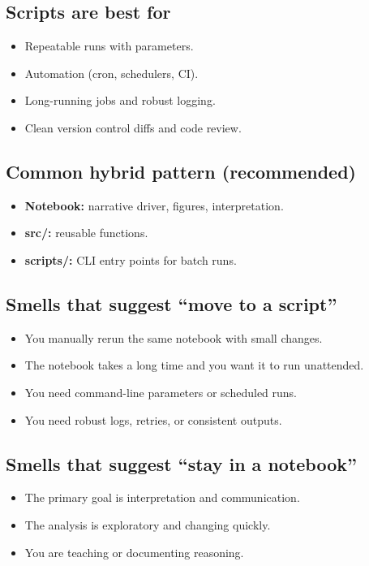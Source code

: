 \subsection{Scripts are best for}
\begin{itemize}
\item Repeatable runs with parameters.
\item Automation (cron, schedulers, CI).
\item Long-running jobs and robust logging.
\item Clean version control diffs and code review.
\end{itemize}

\subsection{Common hybrid pattern (recommended)}
\begin{itemize}
\item \textbf{Notebook:} narrative driver, figures, interpretation.
\item \textbf{src/:} reusable functions.
\item \textbf{scripts/:} CLI entry points for batch runs.
\end{itemize}

\subsection{Smells that suggest ``move to a script''}
\begin{itemize}
\item You manually rerun the same notebook with small changes.
\item The notebook takes a long time and you want it to run unattended.
\item You need command-line parameters or scheduled runs.
\item You need robust logs, retries, or consistent outputs.
\end{itemize}

\subsection{Smells that suggest ``stay in a notebook''}
\begin{itemize}
\item The primary goal is interpretation and communication.
\item The analysis is exploratory and changing quickly.
\item You are teaching or documenting reasoning.
\end{itemize}

